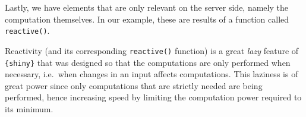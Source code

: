 \documentclass[
]{krantz}
\makeatletter
\newenvironment{Shaded}{\begin{snugshade}}{\end{snugshade}}
\newcommand{\AttributeTok}[1]{\textcolor[rgb]{0.61,0.61,0.61}{#1}}
\newcommand{\CommentTok}[1]{\textcolor[rgb]{0.37,0.37,0.37}{\textit{#1}}}
\newcommand{\ConstantTok}[1]{\textcolor[rgb]{0,0,0}{#1}}
\newcommand{\FunctionTok}[1]{\textcolor[rgb]{0,0,0}{#1}}
\newcommand{\NormalTok}[1]{#1}
\newcommand{\OtherTok}[1]{\textcolor[rgb]{0.37,0.37,0.37}{#1}}
\newcommand{\SpecialCharTok}[1]{\textcolor[rgb]{0,0,0}{#1}}
\newcommand{\StringTok}[1]{\textcolor[rgb]{0.5,0.5,0.5}{#1}}
\newenvironment{kframe}{%
\medskip{}
\setlength{\fboxsep}{.8em}
 \def\at@end@of@kframe{}%
 \ifinner\ifhmode%
  \def\at@end@of@kframe{\end{minipage}}%
  \begin{minipage}{\columnwidth}%
 \fi\fi%
 \def\FrameCommand##1{\hskip\@totalleftmargin \hskip-\fboxsep
 \colorbox{shadecolor}{##1}\hskip-\fboxsep
     \hskip-\linewidth \hskip-\@totalleftmargin \hskip\columnwidth}%
 \MakeFramed {\advance\hsize-\width
   \@totalleftmargin\z@ \linewidth\hsize
   \@setminipage}}%
 {\par\unskip\endMakeFramed%
 \at@end@of@kframe}
\renewenvironment{Shaded}{\begin{kframe}}{\end{kframe}}
\makeatother
\begin{document}
\begin{Shaded}
\end{Shaded}

Lastly, we have elements that are only relevant on the server side, namely the computation themselves. In our example, these are results of a function called \texttt{reactive()}.

Reactivity (and its corresponding \texttt{reactive()} function) is a great \emph{lazy} feature of \texttt{\{shiny\}} that was designed so that the computations are only performed when necessary, i.e.~when changes in an input affects computations. This laziness is of great power since only computations that are strictly needed are being performed, hence increasing speed by limiting the computation power required to its minimum.
\end{document}
